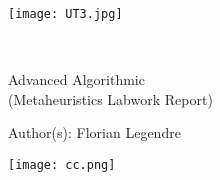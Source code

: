 \documentclass[a4paper, french]{article}
\begin{document}
\begin{titlepage}
    \begin{flushleft}
        \texttt{[image: UT3.jpg]}\par
        \centering
        
        \vspace{13\baselineskip}       
        \HRule \\[0.4cm]

        {\Huge 
        Advanced Algorithmic\\ (Metaheuristics Labwork Report)\par}
        \vspace{0.4cm}
        \HRule
        \vfill
      
        Author(s): Florian Legendre\medskip \par
        
        \texttt{[image: cc.png]}\par
    \end{flushleft}
\end{titlepage}


\newpage
\pagestyle{empty}
\tableofcontents
{}
\pagestyle{plain}

\newpage





\end{document}

